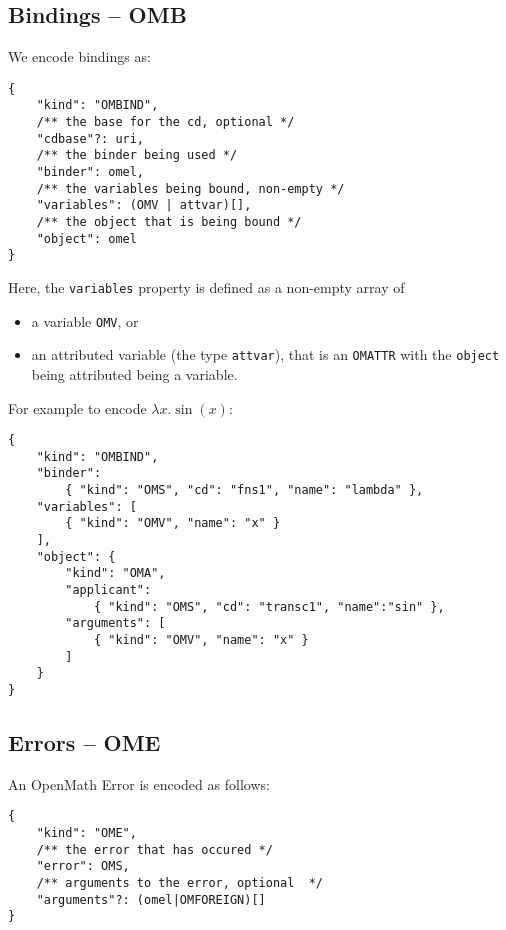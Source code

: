 \subsection{Bindings -- OMB}

We encode bindings as:
\\\begin{minipage}{\linewidth}
\begin{lstlisting}
{
    "kind": "OMBIND", 
    /** the base for the cd, optional */
    "cdbase"?: uri, 
    /** the binder being used */
    "binder": omel,
    /** the variables being bound, non-empty */
    "variables": (OMV | attvar)[],
    /** the object that is being bound */
    "object": omel
}
\end{lstlisting}\end{minipage}

Here, the \texttt{variables} property is defined as a non-empty array of
\begin{itemize}
    \item a variable \texttt{OMV}, or
    \item an attributed variable (the type \texttt{attvar}), that is an \texttt{OMATTR} with the \texttt{object} being attributed being a variable. 
\end{itemize}

For example to encode $\lambda x . \sin(x)$:
\\\begin{minipage}{\linewidth}
\begin{lstlisting}
{  
    "kind": "OMBIND",
    "binder": 
        { "kind": "OMS", "cd": "fns1", "name": "lambda" },
    "variables": [  
        { "kind": "OMV", "name": "x" }
    ],
    "object": {  
        "kind": "OMA",
        "applicant":
            { "kind": "OMS", "cd": "transc1", "name":"sin" },
        "arguments": [
            { "kind": "OMV", "name": "x" }
        ]
    }
}
\end{lstlisting}\end{minipage}

\subsection{Errors -- OME}

An OpenMath Error is encoded as follows:
\\\begin{minipage}{\linewidth}
\begin{lstlisting}
{
    "kind": "OME", 
    /** the error that has occured */
    "error": OMS,
    /** arguments to the error, optional  */
    "arguments"?: (omel|OMFOREIGN)[]
}
\end{lstlisting}\end{minipage}

